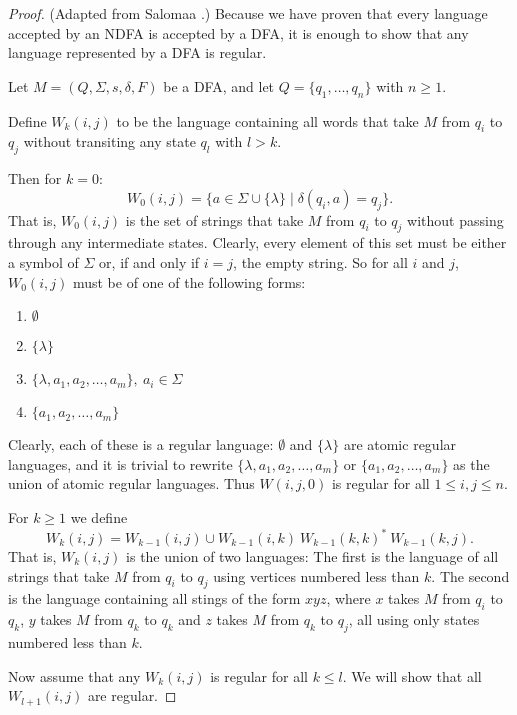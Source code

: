 \documentclass{bcthesis}
\newcommand{\footcite}[2]{\xspace\cite[pg.~{#2}]{#1}\xspace}
\begin{document}
	\begin{proof}
		(Adapted from Salomaa \footcite{salomaa}{29}.)
		Because we have proven that every language accepted by an NDFA is accepted by a DFA, it is enough to show that any language represented by a DFA is regular.

		Let $M = (Q, \Sigma, s, \delta, F)$ be a DFA, and let $Q = \{ q_1, \dots, q_n \}$ with $n \geq 1$.

		Define $W_k(i, j)$ to be the language containing all words that take $M$ from $q_i$ to $q_j$ without transiting any state $q_l$ with $l > k$.

		Then for $k = 0$:
		\[
			W_0(i, j) = \{ a \in \Sigma \cup \{ \lambda \} \mid \delta(q_i, a) = q_j \}.
		\]
		That is, $W_0(i, j)$ is the set of strings that take $M$ from $q_i$ to $q_j$ without passing through any intermediate states.
		Clearly, every element of this set must be either a symbol of $\Sigma$ or, if and only if $i = j$, the empty string.
		So for all $i$ and $j$, $W_0(i, j)$ must be of one of the following forms:
		\begin{enumerate}[label=(\roman*), itemsep = -0.3 ex, nolistsep]
			\item $\emptyset$
			\item $\{ \lambda \}$
			\item $\{ \lambda, a_1, a_2, \dots, a_m \}, \ a_i \in \Sigma$
			\item $\{ a_1, a_2, \dots, a_m \}$
		\end{enumerate}
		Clearly, each of these is a regular language:
		$\emptyset$ and $\{ \lambda \}$ are atomic regular languages, and it is trivial to rewrite $\{ \lambda, a_1, a_2, \dots, a_m \}$ or $\{ a_1, a_2, \dots, a_m \}$ as the union of atomic regular languages.
		Thus $W(i, j, 0)$ is regular for all $1 \leq i, j \leq n$.

		For $k \geq 1$ we define
		\[
			W_k(i, j) = W_{k-1}(i, j) \cup W_{k-1}(i, k) \ W_{k-1}(k, k)^* \ W_{k-1}(k, j).
		\]
		That is, $W_k(i, j)$ is the union of two languages:
		The first is the language of all strings that take $M$ from $q_i$ to $q_j$ using vertices numbered less than $k$.
		The second is the language containing all stings of the form $xyz$, where $x$ takes $M$ from $q_i$ to $q_k$, $y$ takes $M$ from $q_k$ to $q_k$ and $z$ takes $M$ from $q_k$ to $q_j$, all using only states numbered less than $k$.

		Now assume that any $W_k(i, j)$ is regular for all $k \leq l$.
		We will show that all $W_{l+1}(i, j)$ are regular.


\end{proof}
\end{document}
